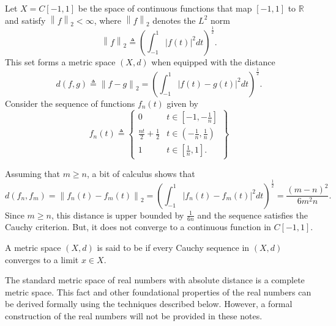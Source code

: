 \begin{example}
\label{example:ContinuousFunctionsCauchy}
Let $X=C[-1,1]$ be the space of continuous functions that map $[-1,1]$ to $\mathbb{R}$ and satisfy $\left\| f \right\|_2 < \infty$, where $\left\| f \right\|_2$ denotes the $L^2$ norm
\begin{equation*}
\left\| f \right\|_2 \triangleq \left( \int_{-1}^1 |f(t)|^2 dt \right)^{\frac{1}{2}}.
\end{equation*}
This set forms a metric space $(X,d)$ when equipped with the distance
\[ d(f, g) \triangleq \left\| f - g \right\|_2
= \left( \int_{-1}^1 |f(t) - g(t)|^2 dt \right)^{\frac{1}{2}}. \]
Consider the sequence of functions $f_n(t)$ given by
\begin{equation*}
f_n(t) \triangleq \left\{ \begin{array}{ll}
0 & t \in \left[ -1, -\frac{1}{n} \right] \\
\frac{nt}{2} + \frac{1}{2} & t \in \left( -\frac{1}{n}, \frac{1}{n} \right) \\
1 & t \in \left[ \frac{1}{n}, 1 \right].
\end{array} \right\}
\end{equation*}

Assuming that $m \geq n$, a bit of calculus shows that
\begin{equation*}
d(f_n, f_m) = \left\| f_n(t) - f_m(t) \right\|_2
= \left( \int_{-1}^1 |f_n(t) - f_m(t)|^2 dt \right)^{\frac{1}{2}}
= \frac{(m-n)^2}{6m^2n}.
\end{equation*}
Since $m\geq n$, this distance is upper bounded by $\frac{1}{6n}$ and the sequence satisfies the Cauchy criterion.
But, it does not converge to a continuous function in $C[-1,1]$.
\end{example}

\begin{definition}
A metric space $(X,d)$ is said to be  if every Cauchy sequence in $(X,d)$ converges to a limit $x \in X$.
\end{definition}

The standard metric space of real numbers with absolute distance is a complete metric space.
This fact and other foundational properties of the real numbers can be derived formally using the techniques described below.
However, a formal construction of the real numbers will not be provided in these notes.


